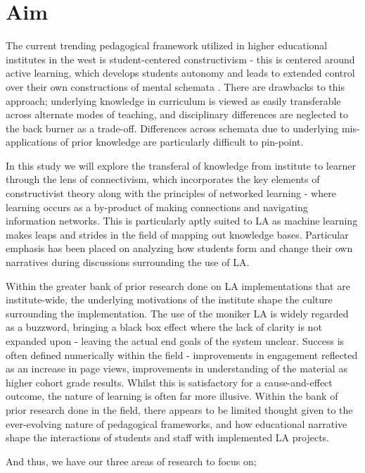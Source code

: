 \documentclass{l4proj}
\begin{document}
\section{Aim}

The current trending pedagogical framework utilized in higher educational institutes in the west is student-centered constructivism - this is centered around active learning, which develops students autonomy and leads to extended control over their own constructions of mental schemata \citep{o2022constructivism}. There are drawbacks to this approach; underlying knowledge in curriculum is viewed as easily transferable across alternate modes of teaching, and disciplinary differences are neglected to the back burner as a trade-off. Differences across schemata due to underlying mis-applications of prior knowledge are particularly difficult to pin-point. 

In this study we will explore the transferal of knowledge from institute to learner through the lens of connectivism, which incorporates the key elements of constructivist theory along with the principles of networked learning - where learning occurs as a by-product of making connections and navigating information networks. This is particularly aptly suited to LA as machine learning makes leaps and strides in the field of mapping out knowledge bases. Particular emphasis has been placed on analyzing how students form and change their own narratives during discussions surrounding the use of LA. 

Within the greater bank of prior research done on LA implementations that are institute-wide, the underlying motivations of the institute shape the culture surrounding the implementation. The use of the moniker LA is widely regarded as a buzzword, bringing a black box effect where the lack of clarity is not expanded upon - leaving the actual end goals of the system unclear. Success is often defined numerically within the field -  improvements in engagement reflected as an increase in page views, improvements in understanding of the material as higher cohort grade results. Whilst this is satisfactory for a cause-and-effect outcome, the nature of learning is often far more illusive. Within the bank of prior research done in the field, there appears to be limited thought given to the ever-evolving nature of pedagogical frameworks, and how educational narrative shape the interactions of students and staff with implemented LA projects. 

And thus, we have our three areas of research to focus on;
\end{document}
